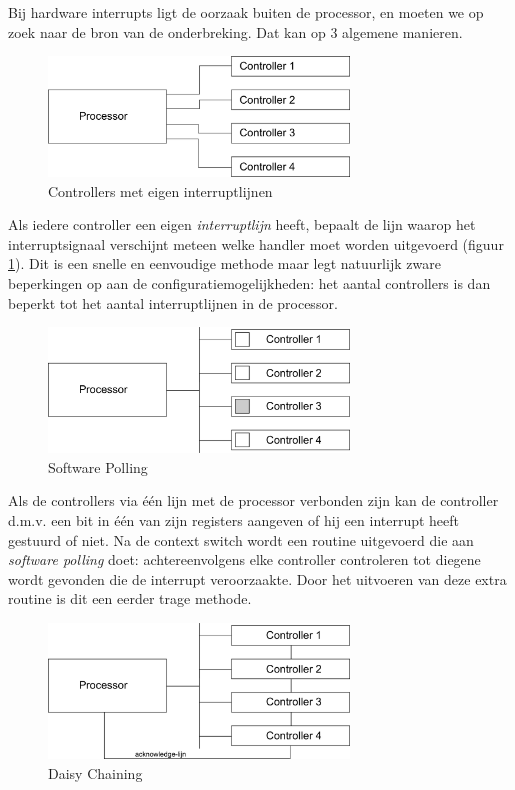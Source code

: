 Bij hardware interrupts ligt de oorzaak buiten de processor, en
moeten we op zoek naar de bron van de onderbreking. Dat kan op 3
algemene manieren.

\begin{figure}
\begin{center}
\includegraphics[width=80mm]{images/fig0203.png}
\end{center}
\caption{Controllers met eigen interruptlijnen}
\label{eigenlijn}
\end{figure}

Als iedere controller een eigen
\emph{interruptlijn} heeft, bepaalt de lijn waarop het
interruptsignaal verschijnt meteen welke handler moet worden
uitgevoerd (figuur \ref{eigenlijn}). Dit is een snelle en eenvoudige methode
maar legt
natuurlijk zware beperkingen op aan de configuratiemogelijkheden: het
aantal controllers is dan beperkt tot het aantal interruptlijnen in de
processor.

\begin{figure}
\begin{center}
\includegraphics[width=80mm]{images/fig0204.png}
\end{center}
\caption{Software Polling}
\label{eenlijn}
\end{figure}

Als de controllers via \'e\'en lijn met de processor verbonden zijn
kan de controller d.m.v. een bit in \'e\'en van zijn registers aangeven of
hij een interrupt heeft gestuurd of niet. Na de context switch wordt
een routine uitgevoerd die aan \emph{software polling}
doet: achtereenvolgens elke controller controleren tot diegene wordt
gevonden die de interrupt veroorzaakte. Door het uitvoeren van deze
extra routine is dit een eerder trage methode.

\begin{figure}
\begin{center}
\includegraphics[width=80mm]{images/fig0205.png}
\end{center}
\caption{Daisy Chaining}
\label{daisy}
\end{figure}

